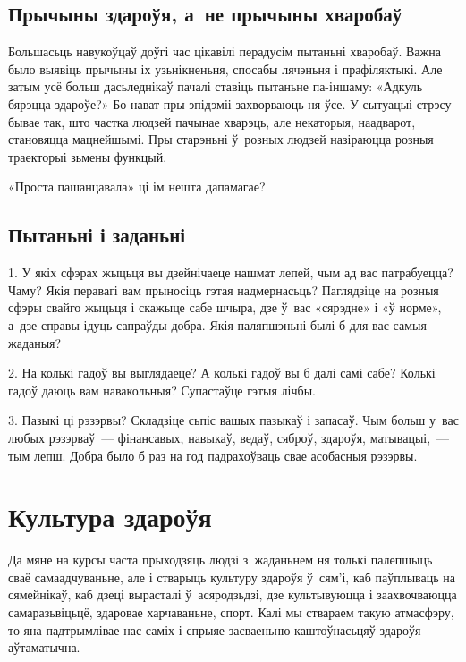 \subsection*{Прычыны здароўя, а~не прычыны хваробаў}

Большасьць навукоўцаў доўгі час цікавілі перадусім пытаньні хваробаў. Важна было выявіць прычыны іх узьнікненьня, спосабы лячэньня і прафіляктыкі. Але затым усё больш дасьледнікаў пачалі ставіць пытаньне па-іншаму: «Адкуль бярэцца здароўе?» Бо нават пры эпідэміі захворваюць ня ўсе. У сытуацыі стрэсу бывае так, што частка людзей пачынае хварэць, але некаторыя, наадварот, становяцца мацнейшымі. Пры старэньні ў~розных людзей назіраюцца розныя траекторыі зьмены функцый. 

«Проста пашанцавала» ці ім нешта дапамагае?

\subsection*{Пытаньні і заданьні}

1. У якіх сфэрах жыцьця вы дзейнічаеце нашмат лепей, чым ад вас патрабуецца? Чаму? Якія перавагі вам прыносіць гэтая надмернасьць? Паглядзіце на розныя сфэры свайго жыцьця і скажыце сабе шчыра, дзе ў~вас «сярэдне» і «ў норме», а~дзе справы ідуць сапраўды добра. Якія паляпшэньні былі б для вас самыя жаданыя?

2. На колькі гадоў вы выглядаеце? А колькі гадоў вы б далі самі сабе? Колькі гадоў даюць вам навакольныя? Супастаўце гэтыя лічбы.

3. Пазыкі ці рэзэрвы? Складзіце сьпіс вашых пазыкаў і запасаў. Чым больш у~вас любых рэзэрваў~--- фінансавых, навыкаў, ведаў, сяброў, здароўя, матывацыі,~--- тым лепш. Добра было б раз на год падрахоўваць свае асобасныя рэзэрвы.


\section{Культура здароўя}

Да мяне на курсы часта прыходзяць людзі з~жаданьнем ня толькі палепшыць сваё самаадчуваньне, але і стварыць культуру здароўя ў~сям'і, каб паўплываць на сямейнікаў, каб дзеці вырасталі ў~асяродзьдзі, дзе культывуюцца і заахвочваюцца самаразьвіцьцё, здаровае харчаваньне, спорт. Калі мы ствараем такую атмасфэру, то яна падтрымлівае нас саміх і спрыяе засваеньню каштоўнасьцяў здароўя аўтаматычна. 


